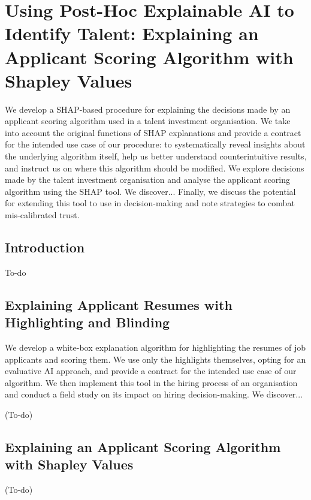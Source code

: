 

\chapter{\label{ch:usingxai}Using Post-Hoc Explainable AI to Identify Talent: Explaining an Applicant Scoring Algorithm with Shapley Values}

\minitoc

We develop a SHAP-based procedure for explaining the decisions made by an applicant scoring algorithm used in a talent investment organisation. We take into account the original functions of SHAP explanations and provide a contract for the intended use case of our procedure: to systematically reveal insights about the underlying algorithm itself, help us better understand counterintuitive results, and instruct us on where this algorithm should be modified. We explore decisions made by the talent investment organisation and analyse the applicant scoring algorithm using the SHAP tool. We discover... Finally, we discuss the potential for extending this tool to use in decision-making and note strategies to combat mis-calibrated trust.

\section{Introduction}
To-do

\section{Explaining Applicant Resumes with Highlighting and Blinding}
We develop a white-box explanation algorithm for highlighting the resumes of job applicants and scoring them. We use only the highlights themselves, opting for an evaluative AI approach, and provide a contract for the intended use case of our algorithm. We then implement this tool in the hiring process of an organisation and conduct a field study on its impact on hiring decision-making. We discover...

(To-do)

\section{Explaining an Applicant Scoring Algorithm with Shapley Values}


(To-do)
